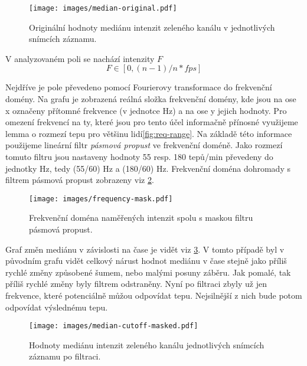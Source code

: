 \documentclass[
  digital, %
  table,   %
%
  lof,     %
  lot,     %
]{fithesis3}
\begin{document}
\begin{figure}
  \begin{center}
    \texttt{[image: images/median-original.pdf]}
  \end{center}
  \caption{Originální hodnoty mediánu intenzit zeleného kanálu v jednotlivých snímcích záznamu.}
  \label{fig:median-original}
\end{figure}

V analyzovaném poli se nachází intenzity $F$
\begin{equation}
F \in [0, (n-1) / n * fps]
\end{equation}

Nejdříve je pole převedeno pomocí Fourierovy transformace do frekvenční domény. Na grafu je zobrazená reálná složka frekvenční domény, kde jsou na ose x označeny přítomné frekvence (v jednotce Hz) a na ose y jejich hodnoty. Pro omezení frekvencí na ty, které jsou pro tento účel informačně přínosné využijeme lemma o rozmezí tepu pro většinu lidí\ref{fig:req-range}. Na základě této informace použijeme lineární filtr \emph{pásmová propust} ve frekvenční doméně. Jako rozmezí tomuto filtru jsou nastaveny hodnoty 55 resp. 180 tepů/min převedeny do jednotky Hz, tedy (55/60) Hz a (180/60) Hz. Frekvenční doména dohromady s filtrem pásmová propust zobrazeny viz \ref{fig:frequency-mask}.

\begin{figure}
  \begin{center}
    \texttt{[image: images/frequency-mask.pdf]}
  \end{center}
  \caption{Frekvenční doména naměřených intenzit spolu s maskou filtru pásmová propust.}
  \label{fig:frequency-mask}
\end{figure}

Graf změn mediánu v závislosti na čase je vidět viz \ref{fig:median-cutoff-masked}.  V tomto případě byl v původním grafu vidět celkový nárust hodnot mediánu v čase stejně jako příliš rychlé změny způsobené šumem, nebo malými posuny záběru. Jak pomalé, tak příliš rychlé změny byly filtrem odstraněny. Nyní po filtraci zbyly už jen frekvence, které potenciálně můžou odpovídat tepu. Nejsilnější z nich bude potom odpovídat výslednému tepu.

\begin{figure}
  \begin{center}
    \texttt{[image: images/median-cutoff-masked.pdf]}
  \end{center}
  \caption{Hodnoty mediánu intenzit zeleného kanálu jednotlivých snímcích záznamu po filtraci.}
  \label{fig:median-cutoff-masked}
\end{figure}
\end{document}
